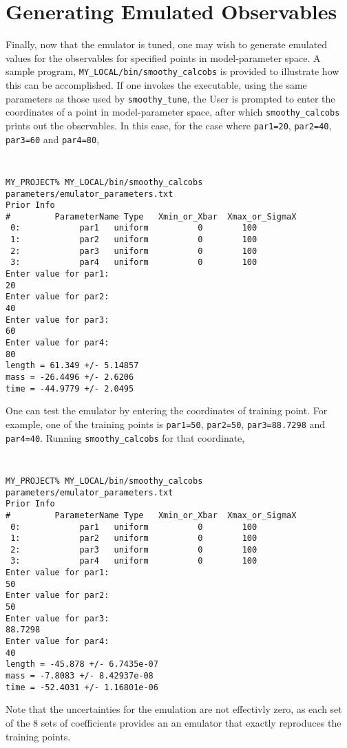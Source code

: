 \documentclass[UserManual.tex]{subfiles}
\begin{document}
\section{Generating Emulated Observables}
Finally, now that the emulator is tuned, one may wish to generate emulated values for the observables for specified points in model-parameter space. A sample program, {\tt MY\_LOCAL/bin/smoothy\_calcobs} is provided to illustrate how this can be accomplished. If one invokes the executable, using the same parameters as those used by {\tt smoothy\_tune}, the User is prompted to enter the coordinates of a point in model-parameter space, after which {\tt smoothy\_calcobs} prints out the observables. In this case, for the case where {\tt par1=20}, {\tt par2=40}, {\tt par3=60} and {\tt par4=80},

{\tt
\begin{verbatim}
MY_PROJECT% MY_LOCAL/bin/smoothy_calcobs parameters/emulator_parameters.txt
Prior Info
#         ParameterName Type   Xmin_or_Xbar  Xmax_or_SigmaX
 0:            par1   uniform          0        100
 1:            par2   uniform          0        100
 2:            par3   uniform          0        100
 3:            par4   uniform          0        100
Enter value for par1:
20
Enter value for par2:
40
Enter value for par3:
60
Enter value for par4:
80
length = 61.349 +/- 5.14857
mass = -26.4496 +/- 2.6206
time = -44.9779 +/- 2.0495
\end{verbatim}
}

One can test the emulator by entering the coordinates of training point. For example, one of the training points is {\tt par1=50}, {\tt par2=50}, {\tt par3=88.7298} and {\tt par4=40}. Running {\tt smoothy\_calcobs} for that coordinate,

{\tt
\begin{verbatim}
MY_PROJECT% MY_LOCAL/bin/smoothy_calcobs parameters/emulator_parameters.txt
Prior Info
#         ParameterName Type   Xmin_or_Xbar  Xmax_or_SigmaX
 0:            par1   uniform          0        100
 1:            par2   uniform          0        100
 2:            par3   uniform          0        100
 3:            par4   uniform          0        100
Enter value for par1:
50
Enter value for par2:
50
Enter value for par3:
88.7298
Enter value for par4:
40
length = -45.878 +/- 6.7435e-07
mass = -7.8083 +/- 8.42937e-08
time = -52.4031 +/- 1.16801e-06
\end{verbatim}
}
Note that the uncertainties for the emulation are not effectivly zero, as each set of the 8 sets of coefficients provides an an emulator that exactly reproduces the training points.
\end{document}

